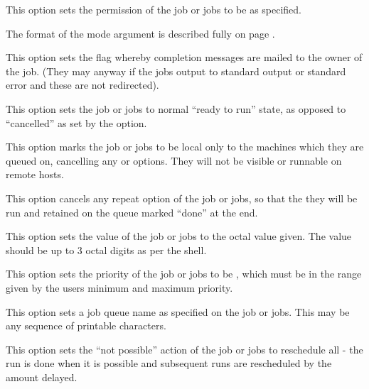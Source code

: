 
This option sets the permission of the job or jobs to be as specified.

The format of the mode argument is described fully on page \pageref{btjchange:modefmt}.



This option sets the flag whereby completion messages are mailed to the owner of the job. (They may anyway if the jobs output to standard
output or standard error and these are not redirected).


This option sets the job or jobs to normal ``ready to run'' state, as opposed to ``cancelled'' as set by the  option.


This option marks the job or jobs to be local only to the machines which they are queued on, cancelling any  or  options. They will not be visible or runnable on remote hosts.


This option cancels any repeat option of the job or jobs, so that the they will be run and retained on the queue marked ``done'' at the end.


This option sets the  value of the job or jobs to the octal value given. The value should be up to 3 octal digits as
per the shell.


This option sets the priority of the job or jobs to be , which must be in the range given by the user{\textquotesingle}s minimum
and maximum priority.


This option sets a job queue name as specified on the job or jobs. This may be any sequence of printable characters.


This option sets the ``not possible'' action of the job or jobs to reschedule all - the run is done when it is possible
and subsequent runs are rescheduled by the amount delayed.

